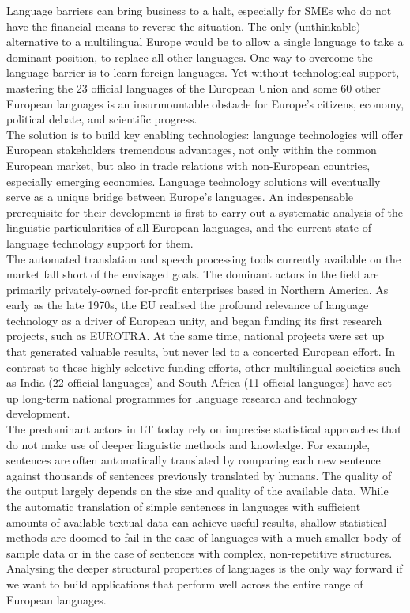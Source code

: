 \begin{multicols}{2}
  Language barriers can bring business to a halt, especially for SMEs who do not have the financial means to reverse the situation. The only (unthinkable) alternative to a multilingual Europe would be to allow a single language to take a dominant position, to replace all other languages. One way to overcome the language barrier is to learn foreign languages. Yet without technological support, mastering the 23 official languages of the European Union and some 60 other European languages is an insurmountable obstacle for Europe’s citizens, economy, political debate, and scientific progress.\\
  The solution is to build key enabling technologies: language technologies will offer European stakeholders tremendous advantages, not only within the common European market, but also in trade relations with non-European countries, especially emerging economies. Language technology solutions will eventually serve as a unique bridge between Europe's languages. An indespensable prerequisite for their development is first to carry out a systematic analysis of the linguistic particularities of all European languages, and the current state of language technology support for them.  \\
  The automated translation and speech processing tools currently available on the market fall short of the envisaged goals. The dominant actors in the field are primarily privately-owned for-profit enterprises based in Northern America. As early as the late 1970s, the EU realised the profound relevance of language technology as a driver of European unity, and began funding its first research projects, such as EUROTRA. At the same time, national projects were set up that generated valuable results, but never led to a concerted European effort. In contrast to these highly selective funding efforts, other multilingual societies such as India (22 official languages) and South Africa (11 official languages) have set up long-term national programmes for language research and technology development. \\
  The predominant actors in LT today rely on imprecise statistical approaches that do not make use of deeper linguistic methods and knowledge. For example, sentences are often automatically translated by comparing each new sentence against thousands of sentences previously translated by humans. The quality of the output largely depends on the size and quality of the available  data. While the automatic translation of simple sentences in languages with sufficient amounts of available textual data can achieve useful results, shallow statistical methods are doomed to fail in the case of languages with a much smaller body of sample data or in the case of sentences with complex, non-repetitive structures. Analysing the deeper structural properties of languages is the only way forward if we want to build applications that perform well across the entire range of European languages.


\end{multicols}
